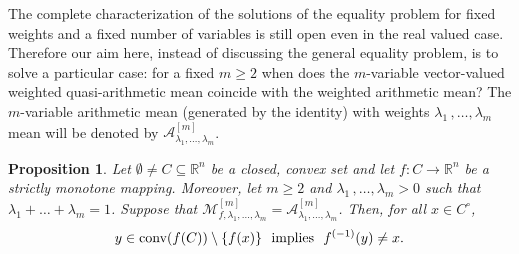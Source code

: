 \documentclass[10pt,a4paper]{amsart}
\newtheorem{prop}{Proposition}%
\newcommand{\Rn}{\mathbb{R}^n}
\newcommand{\conv}{\mbox{\rm conv}}
\newcommand{\map}{\longrightarrow}
\begin{document}
The complete characterization of the solutions of the 
equality problem for fixed weights and 
a fixed number of variables is 
still open even in the real valued case. 
Therefore our aim here, instead of discussing 
the general equality problem, is to solve a particular 
case: for a fixed $ m \geq 2 $ when does the 
$ m $-variable vector-valued weighted quasi-arithmetic 
mean coincide with the weighted arithmetic mean? 
The $ m $-variable arithmetic mean (generated by 
the identity) with weights 
$ \lambda_1 \,, \dots , \lambda_m $ mean will be 
denoted by 
$ \mathcal{A}_{\lambda_1 , \dots , \lambda_m}^{[m]} $.  

\begin{prop}\label{prop-Application_invinj}
Let $ \emptyset \neq C \subseteq \Rn $ be a 
closed, convex set and let $ f : C \map \Rn $ 
be a strictly monotone mapping. Moreover, 
let $ m \geq 2 $ and $ \lambda_1 \,, \dots , \lambda_m > 0 $ 
such that 
$ \lambda_1 + \dots + \lambda_m = 1 $. 
Suppose that 
$ \mathcal{M}_{f, \lambda_1 , \dots , \lambda_m}^{[m]} 
= \mathcal{A}_{\lambda_1 , \dots , \lambda_m}^{[m]} $. 
Then, for all $ x \in C^{\circ} $, 
\[
y \in \conv (f(C)) \setminus \{ f(x) \} 
\ \mbox{ implies } \ 
f^{(-1)}(y) \neq x .
\]
\end{prop}
\end{document}
